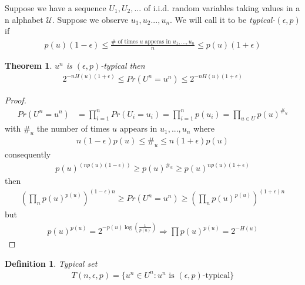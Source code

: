\documentclass{article}
\newtheorem{theorem}{Theorem}[section]
\newtheorem{definition}{Definition}[section]
\def\U{\mathcal{U}}
\begin{document}
Suppose we have a sequence $U_1, U_2, ...$ of i.i.d. random variables taking values in a n alphabet $\U$.
Suppose we observe $u_1,u_2..., u_n$. We will call it to be \textit{typical-$(\epsilon, p)$} if 
\begin{align*}
  p(u) (1 - \epsilon) 
  \leq \frac{\# \text{ of times $u$ apperas in $u_1, ..., u_n$}}{n}
  \leq p(u)(1+\epsilon)
\end{align*}

\begin{theorem}
  $u^n$ is $(\epsilon, p)$-typical then
  \begin{align*}
    2^{-n H(u)(1 + \epsilon)}
    \leq Pr(U^n = u^n)
    \leq 2^{-n H(u)(1 + \epsilon)}
  \end{align*}
\end{theorem}

\begin{proof}
  \begin{align*}
    Pr(U^n = u^n) &= \prod_{i=1}^n Pr(U_i = u_i) = \prod_{i=1}^n p(u_i) = \prod_{u \in U} p(u)^{\#_u}
  \end{align*}
  with $\#_u$ the number of times $u$ appears in $u_1, ..., u_n$ where
  \begin{align*}
    n (1-\epsilon) p(u) \leq \#_u \leq n(1+\epsilon)p(u)
  \end{align*}
  consequently
  \begin{align*}
    p(u)^(n p(u)(1-\epsilon)) \geq p(u)^{\#_u} \geq p(u)^{n p(u)(1+\epsilon)}
  \end{align*}
  then
  \begin{align*}
    (\prod_{n} p(u)^{p(u)})^{(1-\epsilon)n}
    \geq Pr(U^n = u^n)
    \geq (\prod_{n} p(u)^{p(u)})^{(1+\epsilon)n}
  \end{align*}
  but 
  \begin{align*}
    p(u)^{p(u)} = 2^{-p(u) \log(\frac{1}{p(u)})} \Rightarrow \prod p(u)^{p(u)} = 2^{-H(u)}
  \end{align*}
\end{proof}

\begin{definition}{Typical set}
  \begin{align*}
    T(n, \epsilon, p) = \{ u^n \in U^n : u^n \text{ is } (\epsilon, p)\text{-typical}\}
  \end{align*}
\end{definition}
\end{document}
